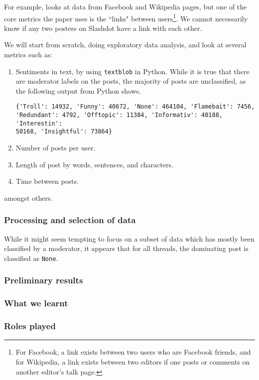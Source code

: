 \documentclass[a4paper,12pt]{article}
\numberwithin{equation}{section}
\begin{document}
For example, \cite{Backstrom+al:13a} looks at data from Facebook and Wikipedia pages, but one of the core metrics the paper uses is the ``links" between users\footnote{For Facebook, a link exists between two users who are Facebook friends, and for Wikipedia, a link exists between two editors if one posts or comments on another editor's talk page.}. We cannot necessarily know if any two posters on Slashdot have a link with each other. 

We will start from scratch, doing exploratory data analysis, and look at several metrics such as:
\vspace*{-0.5cm}
\begin{enumerate}
\item Sentiments in text, by using {\tt textblob} in Python. While it is true that there are moderator labels on the posts, the majority of posts are unclassified, as the following output from Python shows.
\begin{verbatim}
{'Troll': 14932, 'Funny': 40672, 'None': 464104, 'Flamebait': 7456, 
'Redundant': 4792, 'Offtopic': 11384, 'Informativ': 40188, 'Interestin': 
50168, 'Insightful': 73864}
\end{verbatim}
\item Number of posts per user.
\item Length of post by words, sentences, and characters.
\item Time between posts.
\end{enumerate}
amongst others.


\subsubsection*{Processing and selection of data}

While it might seem tempting to focus on a subset of data which has mostly been classified by a moderator, it appears that for all threads, the dominating post is classified as {\tt None}. 





\subsubsection*{Preliminary results}


\subsubsection*{What we learnt}


\subsubsection*{Roles played}


\clearpage

	
\end{document}
